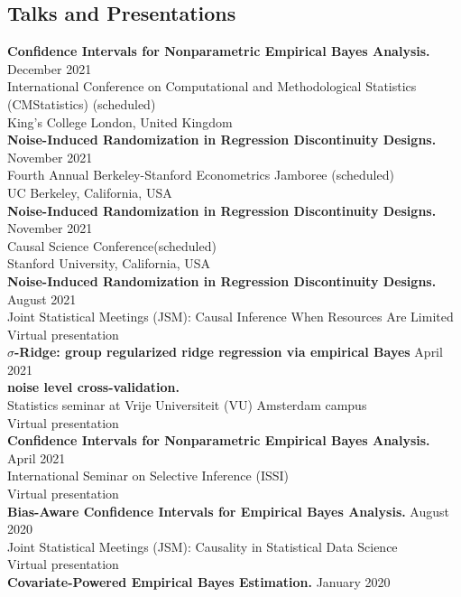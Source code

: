 \documentclass[margin,line]{res}
\begin{document}
\begin{resume}
\section{\sc Talks and Presentations}
\textbf{Confidence Intervals for Nonparametric Empirical Bayes Analysis.} \hfill December 2021\\
International Conference on Computational and Methodological Statistics (CMStatistics) \hfill (scheduled)\\
King's College London, United Kingdom\\
\textbf{Noise-Induced Randomization in Regression Discontinuity Designs.}  \hfill November 2021\\
Fourth Annual Berkeley-Stanford Econometrics Jamboree \hfill (scheduled)\\
UC Berkeley, California, USA \\
\textbf{Noise-Induced Randomization in Regression Discontinuity Designs.}  \hfill November 2021\\
Causal Science Conference\hfill (scheduled)\\
Stanford University, California, USA\\
\textbf{Noise-Induced Randomization in Regression Discontinuity Designs.} \hfill August 2021\\
Joint Statistical Meetings (JSM): Causal Inference When Resources Are Limited\\
Virtual presentation\\
\textbf{$\sigma$-Ridge: group regularized ridge regression via empirical Bayes} \hfill April 2021\\
 \textbf{noise level cross-validation.}\\
Statistics seminar at Vrije Universiteit (VU) Amsterdam campus\\
Virtual presentation\\
\textbf{Confidence Intervals for Nonparametric Empirical Bayes Analysis.} \hfill April 2021\\
International Seminar on Selective Inference (ISSI)\\
Virtual presentation\\
\textbf{Bias-Aware Confidence Intervals for Empirical Bayes Analysis.} \hfill August 2020\\
Joint Statistical Meetings (JSM): Causality in Statistical Data Science\\
Virtual presentation\\
\textbf{Covariate-Powered Empirical Bayes Estimation.} \hfill January 2020\\

\end{resume}
\end{document}
